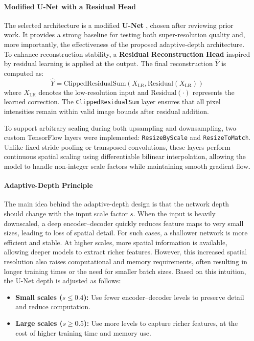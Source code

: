 \paragraph{Modified U-Net with a Residual Head}

The selected architecture is a modified \textbf{U-Net} \cite{ronneberger2015unet}, chosen after reviewing prior work. 
It provides a strong baseline for testing both super-resolution quality and, more importantly, the effectiveness of the proposed adaptive-depth architecture. 
To enhance reconstruction stability, a \textbf{Residual Reconstruction Head} inspired by residual learning \cite{he2016resnet} is applied at the output. 
The final reconstruction $\hat{Y}$ is computed as:
$$
\hat{Y} = \text{ClippedResidualSum}(X_{\text{LR}}, \text{Residual}(X_{\text{LR}}))
$$
where $X_{\text{LR}}$ denotes the low-resolution input and $\text{Residual}(\cdot)$ represents the learned correction. 
The \texttt{ClippedResidualSum} layer ensures that all pixel intensities remain within valid image bounds after residual addition. 

To support arbitrary scaling during both upsampling and downsampling, two custom TensorFlow layers were implemented: 
\texttt{ResizeByScale} and \texttt{ResizeToMatch}. 
Unlike fixed-stride pooling or transposed convolutions, these layers perform continuous spatial scaling using differentiable bilinear interpolation, 
allowing the model to handle non-integer scale factors while maintaining smooth gradient flow.

\paragraph{Adaptive-Depth Principle}

The main idea behind the adaptive-depth design is that the network depth should change with the input scale factor $s$. 
When the input is heavily downscaled, a deep encoder–decoder quickly reduces feature maps to very small sizes, leading to loss of spatial detail. 
For such cases, a shallower network is more efficient and stable. 
At higher scales, more spatial information is available, allowing deeper models to extract richer features. 
However, this increased spatial resolution also raises computational and memory requirements, often resulting in longer training times or the need for smaller batch sizes. 
Based on this intuition, the U-Net depth is adjusted as follows:
\begin{itemize}
    \item \textbf{Small scales ($s \le 0.4$):} Use fewer encoder–decoder levels to preserve detail and reduce computation.  
    \item \textbf{Large scales ($s \ge 0.5$):} Use more levels to capture richer features, at the cost of higher training time and memory use.
\end{itemize}

